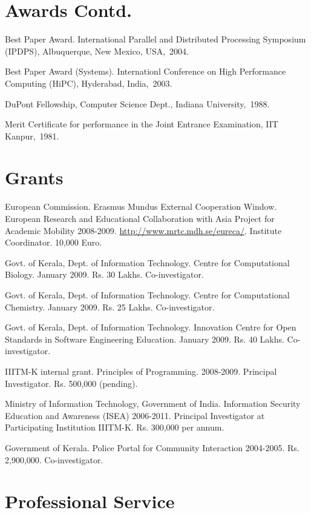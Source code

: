 \documentclass[11pt,margin,line]{res}
\begin{document}
\begin{resume}
\section{\sc Awards Contd.}

Best Paper Award. International Parallel and Distributed
Processing Symposium (IPDPS), Albuquerque, New Mexico,
USA,~2004.


Best Paper Award  (Systems). Internationl Conference on High
Performance Computing (HiPC), Hyderabad, India,~2003.

DuPont Fellowship, Computer Science Dept., Indiana
University,~1988.

Merit Certificate for performance in the Joint Entrance
Examination, IIT Kanpur,~1981.


\section{\sc Grants}

European Commission.  Erasmus Mundus External Cooperation
Window. European Research and Educational Collaboration with
Asia Project for Academic Mobility 2008-2009.
\url{http://www.mrtc.mdh.se/eureca/}.  Institute
Coordinator.  10,000 Euro.

Govt. of Kerala, Dept. of Information Technology.  Centre
for Computational Biology.  January 2009.  Rs. 30 Lakhs.
Co-investigator.

Govt. of Kerala, Dept. of Information Technology.  Centre
for Computational Chemistry.  January 2009.  Rs. 25 Lakhs.
Co-investigator.

Govt. of Kerala, Dept. of Information Technology.
Innovation Centre for Open Standards in Software Engineering
Education.  January 2009.  Rs. 40 Lakhs.  Co-investigator.

IIITM-K internal grant.  Principles of Programming.
2008-2009.  Principal Investigator.  Rs. 500,000 (pending).

Ministry of Information Technology, Government of India.
Information Security Education and Awareness (ISEA)
2006-2011.  Principal Investigator at Participating
Institution IIITM-K.  Rs. 300,000 per annum. 

Government of Kerala.  Police Portal for Community
Interaction 2004-2005.  Rs. 2,900,000.  Co-investigator.


\section{\sc Professional Service}


\end{resume}
\end{document}
